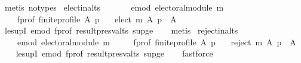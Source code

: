 \begin{isabellebody}
\ {\isacharparenleft}{\kern0pt}metis\ {\isacharparenleft}{\kern0pt}no{\isacharunderscore}{\kern0pt}types{\isacharparenright}{\kern0pt}{\isacharparenright}{\kern0pt}\isanewline
{}\isamarkupfalse%
%
\endisatagproof
{\isafoldproof}%
%
\isadelimproof
\isanewline
%
\endisadelimproof
\isanewline
{}\isamarkupfalse%
\ elect{\isacharunderscore}{\kern0pt}in{\isacharunderscore}{\kern0pt}alts{\isacharcolon}{\kern0pt}\isanewline
\ \ \isanewline
\ \ \ \ e{\isacharunderscore}{\kern0pt}mod{\isacharcolon}{\kern0pt}\ {\isachardoublequoteopen}electoral{\isacharunderscore}{\kern0pt}module\ m{\isachardoublequoteclose}\ \isanewline
\ \ \ \ f{\isacharunderscore}{\kern0pt}prof{\isacharcolon}{\kern0pt}\ {\isachardoublequoteopen}finite{\isacharunderscore}{\kern0pt}profile\ A\ p{\isachardoublequoteclose}\isanewline
\ \ \ {\isachardoublequoteopen}elect\ m\ A\ p\ {\isasymsubseteq}\ A{\isachardoublequoteclose}\isanewline
%
\isadelimproof
\ \ %
\endisadelimproof
%
\isatagproof
{}\isamarkupfalse%
\ le{\isacharunderscore}{\kern0pt}supI{}\ e{\isacharunderscore}{\kern0pt}mod\ f{\isacharunderscore}{\kern0pt}prof\ result{\isacharunderscore}{\kern0pt}presv{\isacharunderscore}{\kern0pt}alts\ sup{\isacharunderscore}{\kern0pt}ge{}\isanewline
\ \ \isamarkupfalse%
\ metis%
\endisatagproof
{\isafoldproof}%
%
\isadelimproof
\isanewline
%
\endisadelimproof
\isanewline
{}\isamarkupfalse%
\ reject{\isacharunderscore}{\kern0pt}in{\isacharunderscore}{\kern0pt}alts{\isacharcolon}{\kern0pt}\isanewline
\ \ \isanewline
\ \ \ \ e{\isacharunderscore}{\kern0pt}mod{\isacharcolon}{\kern0pt}\ {\isachardoublequoteopen}electoral{\isacharunderscore}{\kern0pt}module\ m{\isachardoublequoteclose}\ \isanewline
\ \ \ \ f{\isacharunderscore}{\kern0pt}prof{\isacharcolon}{\kern0pt}\ {\isachardoublequoteopen}finite{\isacharunderscore}{\kern0pt}profile\ A\ p{\isachardoublequoteclose}\isanewline
\ \ \ {\isachardoublequoteopen}reject\ m\ A\ p\ {\isasymsubseteq}\ A{\isachardoublequoteclose}\isanewline
%
\isadelimproof
\ \ %
\endisadelimproof
%
\isatagproof
{}\isamarkupfalse%
\ le{\isacharunderscore}{\kern0pt}supI{}\ e{\isacharunderscore}{\kern0pt}mod\ f{\isacharunderscore}{\kern0pt}prof\ result{\isacharunderscore}{\kern0pt}presv{\isacharunderscore}{\kern0pt}alts\ sup{\isacharunderscore}{\kern0pt}ge{}\isanewline
\ \ \isamarkupfalse%
\ fastforce%
\endisatagproof
{\isafoldproof}%

\end{isabellebody}
